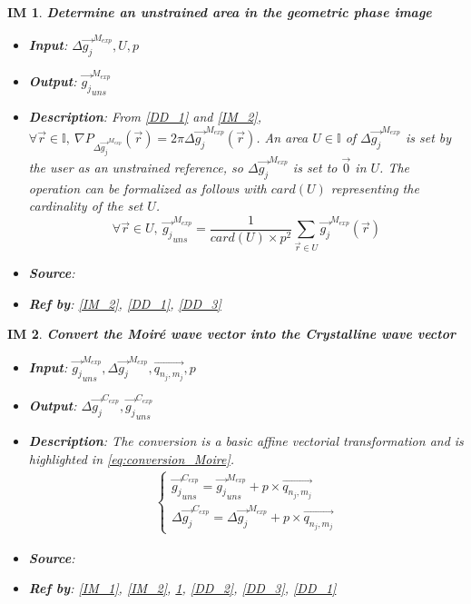 \documentclass[12pt]{article}
\newtheorem{IM}{IM}
\begin{document}
\begin{IM}
\label{IM_3}
\noindent\colorbox{shadecolorIM}{\normalfont \textbf{Determine an unstrained area in the geometric phase image}}
\normalfont
\begin{itemize}
\item \textbf{Input}: $\Delta \overrightarrow{g_{j}}^{M_{exp}},U,p$
\item \textbf{Output}: $\overrightarrow{g_{j}}_{uns}^{M_{exp}}$
\item \textbf{Description}: From \cref{DD_1} and \cref{IM_2}, $\forall \vec{r} \in \mathbb{I},\  \nabla P_{\Delta \overrightarrow{g_{j}}^{M_{exp}}} (\vec{r}) = 2\pi \Delta \overrightarrow{g_{j}}^{M_{exp}}(\vec{r})$. An area $U \in \mathbb{I}$ of $\Delta \overrightarrow{g_{j}}^{M_{exp}}$ is set by the user as an unstrained reference, so $\Delta \overrightarrow{g_{j}}^{M_{exp}}$ is set to $\overrightarrow{0}$ in $U$. The operation can be formalized as follows with $card(U)$ representing the cardinality of the set $U$.
\begin{equation}
\forall \vec{r} \in U, \ \overrightarrow{g_{j}}_{uns}^{M_{exp}}=\frac{1}{card(U)\times p^2}\sum_{\vec{r}\in U}\overrightarrow{g_{j}}^{M_{exp}}(\vec{r})
\end{equation}
\item \textbf{Source}: \cite{Hytch1998}
\item \textbf{Ref by}: \cref{IM_2}, \cref{DD_1}, \cref{DD_3}
\end{itemize}
\end{IM}

\begin{IM}
\label{IM_4}
\noindent\colorbox{shadecolorIM}{\normalfont \textbf{Convert the Moir{\'e} wave vector into the Crystalline wave vector}}
\normalfont
\begin{itemize}
\item \textbf{Input}: $\overrightarrow{g_{j}}_{uns}^{M_{exp}},\Delta \overrightarrow{g_{j}}^{M_{exp}},\overrightarrow{q_{n_j,m_j}},p$
\item \textbf{Output}: $\Delta \overrightarrow{g_{j}}^{C_{exp}},\overrightarrow{g_{j}}_{uns}^{C_{exp}}$
\item \textbf{Description}: The conversion is a basic affine vectorial transformation and is highlighted in \cref{eq:conversion_Moire}.
\begin{equation}
\label{eq:conversion_Moire}
\begin{gathered}
\begin{cases}
\overrightarrow{g_{j}}_{uns}^{C_{exp}}= \overrightarrow{g_{j}}_{uns}^{M_{exp}} + p \times \overrightarrow{q_{n_j,m_j}} \\
\Delta \overrightarrow{g_{j}}^{C_{exp}}= \Delta \overrightarrow{g_{j}}^{M_{exp}} + p \times \overrightarrow{q_{n_j,m_j}}
\end{cases}
\end{gathered}
\end{equation}
\item \textbf{Source}: \cite{Pofelski2017}
\item \textbf{Ref by}: \cref{IM_1}, \cref{IM_2}, \cref{IM_3}, \cref{DD_2}, \cref{DD_3}, \cref{DD_1}
\end{itemize}
\end{IM}
\end{document}

